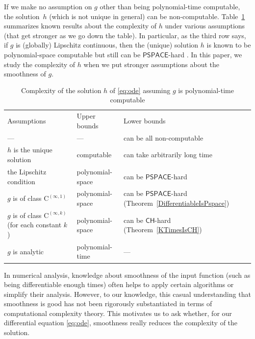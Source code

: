 \documentclass{lmcs}
\theoremstyle{definition}
\theoremstyle{remark}
\newcommand{\classPSPACE}{\mathsf{PSPACE}}
\newcommand{\classCH}{\mathsf{CH}}
\newcommand{\classC}{\mathrm C}
\begin{document}
If we make no assumption on $g$ other than being polynomial-time computable, 
the solution~$h$ (which is not unique in general) can be non-computable. 
Table~\ref{table:related} summarizes known results about 
the complexity of $h$ under various assumptions 
(that get stronger as we go down the table). 
In particular, 
as the third row says, 
if $g$ is (globally) Lipschitz continuous, 
then the (unique) solution $h$ is known to be 
polynomial-space computable but still can be 
$\classPSPACE$-hard \cite{kawamura2010lipschitz}. 
In this paper, we study the complexity of $h$ 
when we put stronger assumptions about 
the smoothness of $g$. 

\begin{table}
\renewcommand\arraystretch{1.3}
\begin{center}
 \caption{Complexity of the solution $h$ of \eqref{eq:ode}
 assuming $g$ is polynomial-time computable}
 \label{table:related}
\small\vspace{3pt}
 \begin{tabular}{lll}
  Assumptions & Upper bounds & Lower bounds \\
  \noalign{\smallskip}
  \hline
  \noalign{\smallskip}
   --- & --- & can be all non-computable \cite{pour1979computable} \\
  $h$ is the unique solution & computable \cite{coddington1955theory}
  & \parbox[t]{14em}{can take arbitrarily long time\\\cite{ko1983computational,miller1970recursive}} \\
  the Lipschitz condition  & polynomial-space \cite{ko1983computational}
      &	can be $\classPSPACE$-hard \cite{kawamura2010lipschitz}\\
  $g$ is of class $\classC ^{(\infty, 1)}$ & polynomial-space 
      & \parbox[t]{14em}{can be $\classPSPACE$-hard\\(Theorem~\ref{DifferentiableIsPspace})} \\
  \parbox[t]{10.55em}{$g$ is of class $\classC ^{(\infty, k)}$\\{}(for each constant $k$)}
  & polynomial-space 
  & can be $\classCH$-hard (Theorem~\ref{KTimesIsCH}) \\
  $g$ is analytic
  & polynomial-time \cite{muller1987uniform,ko1988computing,kawamura2010complexity} 
  & ---
 \end{tabular}
\end{center}
\end{table}

In numerical analysis, 
knowledge about smoothness of the input function 
(such as being differentiable enough times) 
often helps
to apply certain algorithms or simplify their analysis.
However, 
to our knowledge, 
this casual understanding that smoothness is good 
has not been rigorously substantiated 
in terms of computational complexity theory. 
This motivates us to ask whether, 
for our differential equation \eqref{eq:ode}, 
smoothness really reduces the complexity of the solution. 
\end{document}
